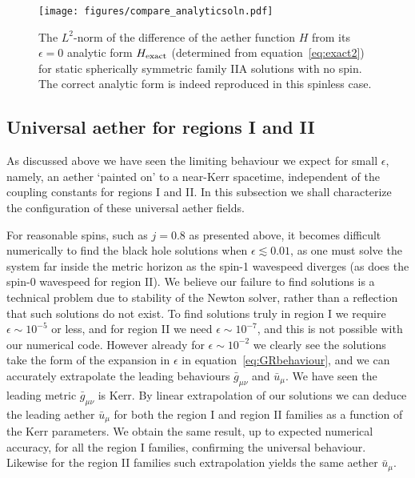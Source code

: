 \documentclass[12pt]{article}
\numberwithin{equation}{section}
\begin{document}
\begin{figure}
\centerline{
  \texttt{[image: figures/compare\_analyticsoln.pdf]}
  }
  \caption{\label{fig:checkExact}
  The $L^2$-norm of the difference of the aether function $H$ from its $\epsilon = 0$ analytic form $H_{\rm exact}$  (determined from equation~\eqref{eq:exact2})
  for static spherically symmetric family IIA solutions with no spin. The correct analytic form is indeed reproduced in this spinless case. 
  }
\end{figure}




\subsection{Universal aether for regions I and II}
\label{sec:aetherregionsIandII}

As discussed above we have seen the limiting behaviour we expect for small $\epsilon$, namely, an aether `painted on' to  a near-Kerr spacetime, independent of the coupling 
constants for regions I and II. In this subsection we shall characterize the configuration of these universal aether fields.

For reasonable spins, such as $j = 0.8$ as presented above, it becomes difficult numerically to find the  black hole solutions when $\epsilon \lesssim 0.01$, as one must solve the system far inside the metric horizon as the spin-1 wavespeed diverges (as does the spin-0 wavespeed for region II). We believe our failure to find solutions is a technical problem due to stability of the Newton solver, rather than a reflection that such solutions do not exist. 
To find solutions truly in region I we require $\epsilon \sim 10^{-5}$ or less, and for region II we need $\epsilon \sim 10^{-7}$, and this is not possible with our numerical code. However already for $\epsilon \sim 10^{-2}$ we clearly see the solutions take the form of the expansion in $\epsilon$  in equation~\eqref{eq:GRbehaviour}, and we can accurately extrapolate the leading behaviours $\bar{g}_{\mu\nu}$ and $\bar{u}_\mu$. We have seen the leading metric $\bar{g}_{\mu\nu}$ is Kerr. By linear extrapolation of our solutions we can deduce the leading aether $\bar{u}_\mu$ for both the region I and region II families as a function of the Kerr parameters. We obtain the same result, up to expected numerical accuracy, for all the region I families, confirming the universal behaviour. Likewise for the region II families such extrapolation yields the same aether $\bar{u}_\mu$. 
\end{document}
